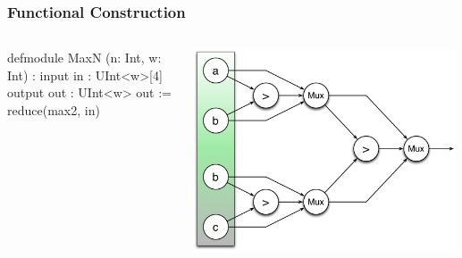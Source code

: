 \documentclass[xcolor=pdflatex,dvipsnames,table]{beamer}
\begin{document}
\begin{frame}[fragile]
\frametitle{Functional Construction}

\begin{columns}


{
\begin{stanza}
defmodule MaxN (n: Int, w: Int) :
  input in : UInt<w>[4]
  output out : UInt<w>
  out := reduce(max2, in)
\end{stanza}
}


\begin{center}
\includegraphics[width=0.99\textwidth]{figs/reduceMax.pdf} \\
\end{center}

\end{columns}

\end{frame}
\end{document}
